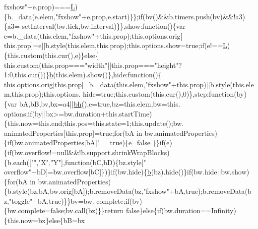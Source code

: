 \begin{DoxyCode}
{      fxshow"}+e.prop)===\hyperlink{jquery_8js_a38ee4c0b5f4fe2a18d0c783af540d253}{L})\{b.\_data(e.elem,\textcolor{stringliteral}{"fxshow"}+e.prop,e.start)\}\};\textcolor{keywordflow}{if}(bv()&&b.timers.push(bv)&&!a3)\{a3=
      setInterval(bw.tick,bw.interval)\}\},show:\textcolor{keyword}{function}()\{var e=b.\_data(this.elem,\textcolor{stringliteral}{"fxshow"}+this.prop);this.options.orig[
      this.prop]=e||b.style(this.elem,this.prop);this.options.show=\textcolor{keyword}{true};\textcolor{keywordflow}{if}(e!==\hyperlink{jquery_8js_a38ee4c0b5f4fe2a18d0c783af540d253}{L})\{this.custom(this.cur(),e)\}\textcolor{keywordflow}{else}\{
      this.custom(this.prop===\textcolor{stringliteral}{"width"}||this.prop===\textcolor{stringliteral}{"height"}?1:0,this.cur())\}\hyperlink{jquery_8js_aa4026ad5544b958e54ce5e106fa1c805}{b}(this.elem).show()\},hide:\textcolor{keyword}{function}()\{
      this.options.orig[this.prop]=b.\_data(this.elem,\textcolor{stringliteral}{"fxshow"}+this.prop)||b.style(this.elem,this.prop);this.options.
      hide=\textcolor{keyword}{true};this.custom(this.cur(),0)\},step:\textcolor{keyword}{function}(by)\{var bA,bB,bv,bx=a4||\hyperlink{jquery_8js_a6fc9115e5c9c910cae480abf0a8c7ae3}{bh}(),e=\textcolor{keyword}{true},bz=this.elem,bw=this.
      options;\textcolor{keywordflow}{if}(by||bx>=bw.duration+\textcolor{keyword}{this}.startTime)\{this.now=this.end;this.pos=this.state=1;this.update();bw.
      animatedProperties[this.prop]=\textcolor{keyword}{true};\textcolor{keywordflow}{for}(bA in bw.animatedProperties)\{\textcolor{keywordflow}{if}(bw.animatedProperties[bA]!==\textcolor{keyword}{true})\{e=\textcolor{keyword}{false}
      \}\}\textcolor{keywordflow}{if}(e)\{\textcolor{keywordflow}{if}(bw.overflow!=null&&!b.support.shrinkWrapBlocks)\{b.each([\textcolor{stringliteral}{""},\textcolor{stringliteral}{"X"},\textcolor{stringliteral}{"Y"}],\textcolor{keyword}{function}(bC,bD)\{bz.style[\textcolor{stringliteral}{"
      overflow"}+bD]=bw.overflow[bC]\})\}\textcolor{keywordflow}{if}(bw.hide)\{\hyperlink{jquery_8js_aa4026ad5544b958e54ce5e106fa1c805}{b}(bz).hide()\}\textcolor{keywordflow}{if}(bw.hide||bw.show)\{\textcolor{keywordflow}{for}(bA in bw.animatedProperties)
      \{b.style(bz,bA,bw.orig[bA]);b.removeData(bz,\textcolor{stringliteral}{"fxshow"}+bA,\textcolor{keyword}{true});b.removeData(bz,\textcolor{stringliteral}{"toggle"}+bA,\textcolor{keyword}{true})\}\}bv=bw.
      complete;\textcolor{keywordflow}{if}(bv)\{bw.complete=\textcolor{keyword}{false};bv.call(bz)\}\}\textcolor{keywordflow}{return} \textcolor{keyword}{false}\}\textcolor{keywordflow}{else}\{\textcolor{keywordflow}{if}(bw.duration==Infinity)\{this.now=bx\}\textcolor{keywordflow}{else}\{bB=bx

\end{DoxyCode}
